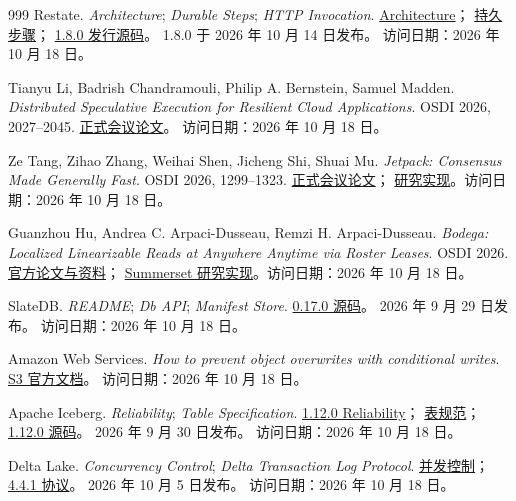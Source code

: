 \begin{thebibliography}{999}
Restate. \textit{Architecture}; \textit{Durable Steps}; \textit{HTTP Invocation}.
\href{https://docs.restate.dev/references/architecture}{Architecture}；
\href{https://docs.restate.dev/develop/python/durable-steps}{持久步骤}；
\href{https://github.com/restatedev/restate/tree/v1.8.0}{1.8.0 发行源码}。
1.8.0 于 2026 年 10 月 14 日发布。
访问日期：2026 年 10 月 18 日。

Tianyu Li, Badrish Chandramouli, Philip A. Bernstein, Samuel Madden.
\textit{Distributed Speculative Execution for Resilient Cloud Applications}.
OSDI 2026, 2027--2045.
\href{https://www.usenix.org/system/files/osdi26-li-tianyu.pdf}{正式会议论文}。
访问日期：2026 年 10 月 18 日。

Ze Tang, Zihao Zhang, Weihai Shen, Jicheng Shi, Shuai Mu.
\textit{Jetpack: Consensus Made Generally Fast}. OSDI 2026, 1299--1323.
\href{https://www.usenix.org/system/files/osdi26-tang.pdf}{正式会议论文}；
\href{https://github.com/stonysystems/jetpack/tree/jetpack}{研究实现}。访问日期：2026 年 10 月 18 日。

Guanzhou Hu, Andrea C. Arpaci-Dusseau, Remzi H. Arpaci-Dusseau.
\textit{Bodega: Localized Linearizable Reads at Anywhere Anytime via Roster Leases}.
OSDI 2026.
\href{https://www.usenix.org/conference/osdi26/presentation/hu-guanzhou}{官方论文与资料}；
\href{https://github.com/josehu07/summerset/tree/bodega-artifact}{Summerset 研究实现}。访问日期：2026 年 10 月 18 日。

SlateDB. \textit{README}; \textit{Db API}; \textit{Manifest Store}.
\href{https://github.com/slatedb/slatedb/tree/v0.17.0}{0.17.0 源码}。
2026 年 9 月 29 日发布。
访问日期：2026 年 10 月 18 日。

Amazon Web Services. \textit{How to prevent object overwrites with conditional writes}.
\href{https://docs.aws.amazon.com/AmazonS3/latest/userguide/conditional-writes.html}{S3 官方文档}。
访问日期：2026 年 10 月 18 日。

Apache Iceberg. \textit{Reliability}; \textit{Table Specification}.
\href{https://iceberg.apache.org/docs/latest/reliability/}{1.12.0 Reliability}；
\href{https://iceberg.apache.org/spec/}{表规范}；
\href{https://github.com/apache/iceberg/tree/apache-iceberg-1.12.0}{1.12.0 源码}。
2026 年 9 月 30 日发布。
访问日期：2026 年 10 月 18 日。

Delta Lake. \textit{Concurrency Control}; \textit{Delta Transaction Log Protocol}.
\href{https://docs.delta.io/concurrency-control/}{并发控制}；
\href{https://github.com/delta-io/delta/blob/v4.4.1/PROTOCOL.md}{4.4.1 协议}。
2026 年 10 月 5 日发布。
访问日期：2026 年 10 月 18 日。


\end{thebibliography}
